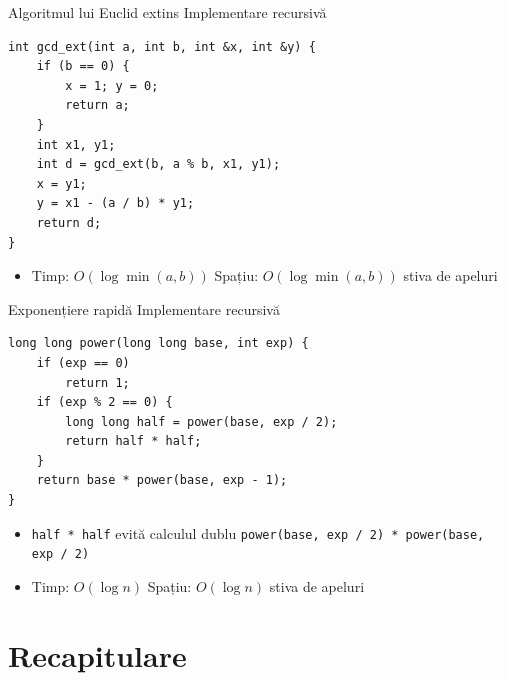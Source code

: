 ﻿\documentclass{beamer}
\begin{document}
\begin{frame}{Algoritmul lui Euclid extins \textemdash{} Implementare recursivă}
  \begin{center}
  \begin{lstlisting}
int gcd_ext(int a, int b, int &x, int &y) {
    if (b == 0) {
        x = 1; y = 0;
        return a;
    }
    int x1, y1;
    int d = gcd_ext(b, a % b, x1, y1);
    x = y1;
    y = x1 - (a / b) * y1;
    return d;
}
  \end{lstlisting}
  \end{center}
  \begin{itemize}
    \item Timp: $O(\log \min(a, b))$ \quad Spațiu: $O(\log \min(a, b))$ \textemdash{} stiva de apeluri
  \end{itemize}
\end{frame}

\begin{frame}{Exponențiere rapidă \textemdash{} Implementare recursivă}
  \begin{center}
  \begin{lstlisting}
long long power(long long base, int exp) {
    if (exp == 0)
        return 1;
    if (exp % 2 == 0) {
        long long half = power(base, exp / 2);
        return half * half;
    }
    return base * power(base, exp - 1);
}
  \end{lstlisting}
  \end{center}
  \begin{itemize}
    \item \lstinline|half * half| evită calculul dublu \lstinline[keepspaces=true]|power(base, exp / 2) * power(base, exp / 2)|
    \item Timp: $O(\log n)$ \quad Spațiu: $O(\log n)$ \textemdash{} stiva de apeluri
  \end{itemize}
\end{frame}

\section{Recapitulare}
\end{document}
